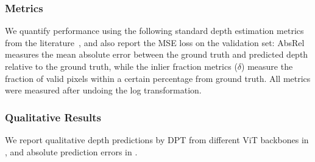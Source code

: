\subsubsection{Metrics}

We quantify performance using the following standard depth estimation metrics from the literature~\citep{hermann2020self, eigen2014depth}, and also report the MSE loss on the validation set:
AbsRel measures the mean absolute error between the ground truth and predicted depth relative to the ground truth, while the inlier fraction metrics ($\delta$) measure the fraction of valid pixels within a certain 
percentage
from ground truth.
All metrics were measured after undoing the log transformation.

\subsubsection{Qualitative Results}

We report qualitative depth predictions by DPT from different ViT backbones in , and absolute prediction errors in .